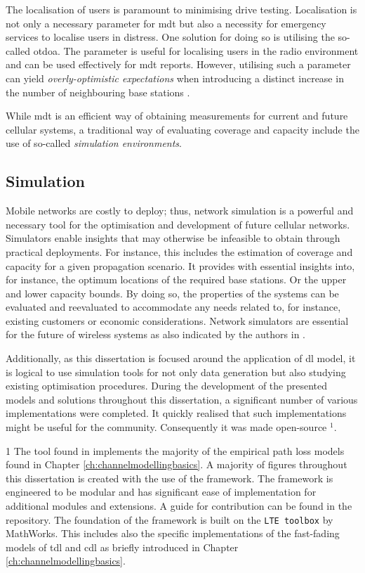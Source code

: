 The localisation of users is paramount to minimising drive testing. Localisation is not only a necessary parameter for \gls{mdt} but also a necessity for emergency services to localise users in distress. One solution for doing so is utilising the so-called \gls{otdoa}. The parameter is useful for localising users in the radio environment \cite{Johansson2012} and can be used effectively for \gls{mdt} reports. However, utilising such a parameter can yield \emph{overly-optimistic expectations} when introducing a distinct increase in the number of neighbouring base stations \cite{Sivers2015, Schloemann2016}. 

While \gls{mdt} is an efficient way of obtaining measurements for current and future cellular systems, a traditional way of evaluating coverage and capacity include the use of so-called \emph{simulation environments}. 

\subsection{Simulation}
Mobile networks are costly to deploy; thus, network simulation is a powerful and necessary tool for the optimisation and development of future cellular networks. Simulators enable insights that may otherwise be infeasible to obtain through practical deployments. For instance, this includes the estimation of coverage and capacity for a given propagation scenario. It provides with essential insights into, for instance, the optimum locations of the required base stations. Or the upper and lower capacity bounds. By doing so, the properties of the systems can be evaluated and reevaluated to accommodate any needs related to, for instance, existing customers or economic considerations. Network simulators are essential for the future of wireless systems as also indicated by the authors in \cite{Cavalcanti2017}. 

Additionally, as this dissertation is focused around the application of \gls{dl} model, it is logical to use simulation tools for not only data generation but also studying existing optimisation procedures. During the development of the presented models and solutions throughout this dissertation, a significant number of various implementations were completed. It quickly realised that such implementations might be useful for the community. Consequently it was made open-source \cite{monster}$^1$.
\begin{marginfigure}
1 The tool found in \cite{monster} implements the majority of the empirical path loss models found in Chapter \ref{ch:channelmodellingbasics}. A majority of figures throughout this dissertation is created with the use of the framework. The framework is engineered to be modular and has significant ease of implementation for additional modules and extensions. A guide for contribution can be found in the repository. The foundation of the framework is built on the \texttt{LTE toolbox} by MathWorks. This includes also the specific implementations of the fast-fading models of \gls{tdl} and \gls{cdl} as briefly introduced in Chapter \ref{ch:channelmodellingbasics}.
\end{marginfigure}


